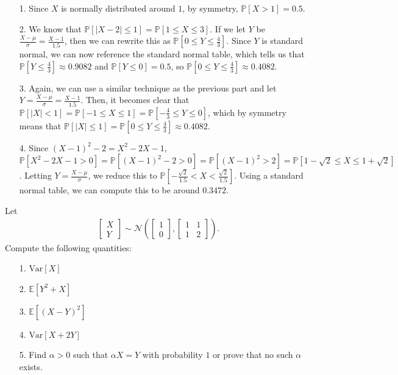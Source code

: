 \documentclass[a4paper]{article}
\begin{document}
\begin{Solution}
	\begin{itemize}
		\item[1.] Since $X$ is normally distributed around $1$, by symmetry, $\mathbb{P}[X > 1] = 0.5.$ 
		\item[2.] We know that $\mathbb{P}[|X - 2| \le 1] = \mathbb{P}[1 \le X \le 3]$. If we let $Y$ be $\frac{X - \mu}{\sigma} = \frac{X - 1}{1.5}$, then we can rewrite this as $\mathbb{P}\left[0 \le Y \le \frac{4}{3}\right]$. Since $Y$ is standard normal, we can now reference the standard normal table, which tells us that $\mathbb{P}\left[Y \le \frac{4}{3}\right] \approx 0.9082$ and $\mathbb{P}\left[Y \le 0\right] = 0.5$, so $\mathbb{P}\left[0 \le Y \le \frac{4}{3}\right] \approx \boxed{0.4082}.$
		\item[3.] Again, we can use a similar technique as the previous part and let $Y= \frac{X - \mu}{\sigma} = \frac{X - 1}{1.5}$. Then, it becomes clear that $\mathbb{P}[|X| < 1] =\mathbb{P}[-1 \le X \le 1] =\mathbb{P}\left[ -\frac{4}{3} \le Y \le 0 \right]$, which by symmetry means that $\mathbb{P}[|X| \le 1] = \mathbb{P}\left[0 \le Y \le \frac{4}{3}\right] \approx \boxed{0.4082}.$
		\item[4.] Since $(X - 1)^2 - 2 = X^2 - 2X - 1$, $\mathbb{P}[X^2 - 2X - 1 > 0] = \mathbb{P}[(X - 1)^2 - 2 > 0] = \mathbb{P}[(X - 1)^2 > 2] = \mathbb{P}[1 - \sqrt{2} \le X \le 1 + \sqrt{2}]$. Letting $Y = \frac{X - \mu}{\sigma}$, we reduce this to $\mathbb{P}\left[-\frac{\sqrt{2}}{1.5} < X < \frac{\sqrt{2}}{1.5}\right]$. Using a standard normal table, we can compute this to be around $\boxed{0.3472}$.
	\end{itemize}
\end{Solution}
\begin{Exercise}
	Let 
	\begin{align*}
		\begin{bmatrix}
			X \\ Y
			\end{bmatrix} \sim \mathcal{N} \left( \begin{bmatrix}
				1 \\ 0
			\end{bmatrix},
				\begin{bmatrix}
				1 & 1 \\ 1 & 2
			\end{bmatrix}
		\right).
	\end{align*}
	Compute the following quantities:
	\begin{itemize}
		\item[1.] $\text{Var}[X]$
		\item[2.] $\mathbb{E}[Y^2 + X]$
		\item[3.] $\mathbb{E}[(X - Y)^2]$
		\item[4.] $\text{Var}[X + 2Y]$
		\item[5.] Find $\alpha > 0$ such that $\alpha X = Y$ with probability $1$ or prove that no such $\alpha$ exists.
	\end{itemize}
\end{Exercise}
\end{document}
